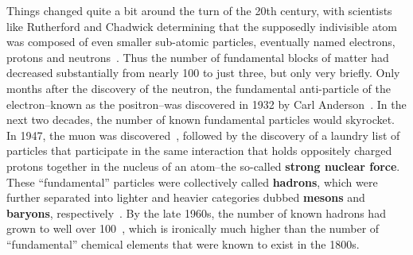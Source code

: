 Things changed quite a bit around the turn of the 20th century, with scientists like Rutherford and Chadwick determining that the supposedly indivisible atom was composed of even smaller sub-atomic particles, eventually named electrons, protons and neutrons~\cite{Electrons, Protons, Neutrons}. Thus the number of fundamental blocks of matter had decreased substantially from nearly 100 to just three, but only very briefly. Only months after the discovery of the neutron, the fundamental anti-particle of the electron--known as the positron--was discovered in 1932 by Carl Anderson~\cite{Positron}. In the next two decades, the number of known fundamental particles would skyrocket. In 1947, the muon was discovered~\cite{Muon}, followed by the discovery of a laundry list of particles that participate in the same interaction that holds oppositely charged protons together in the nucleus of an atom--the so-called \textbf{strong nuclear force}. These ``fundamental'' particles were collectively called \textbf{hadrons}, which were further separated into lighter and heavier categories dubbed \textbf{mesons} and \textbf{baryons}, respectively~\cite{MesonBaryon}. By the late 1960s, the number of known hadrons had grown to well over 100~\cite{ParticleDiscoveries}, which is ironically much higher than the number of ``fundamental'' chemical elements that were known to exist in the 1800s.

